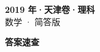 \documentclass[zihao=-4, a4paper]{ctexart}
\begin{document}
\begin{center}
  {\Large\bfseries 2019 年·天津卷·理科}\\[4pt]
  {\large 数学 · 简答版}
\end{center}
\medskip
{}

\clearpage
{}
\begin{center}{\Large\bfseries 答案速查}\end{center}
\medskip

\end{document}
